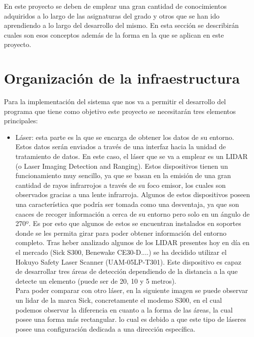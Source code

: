 \textit{}

En este proyecto se deben de emplear una gran cantidad de  conocimientos adquiridos a lo largo de las asignaturas del grado y otros que se han ido aprendiendo a lo largo del desarrollo del mismo. En esta sección se describirán cuales son esos conceptos además de la forma en la que se aplican en este proyecto.

\section{Organización de la infraestructura}

Para la implementación del sistema que nos va a permitir el desarrollo del programa que tiene como objetivo este proyecto se necesitarán tres elementos principales:
\begin{itemize}
	 \item Láser: esta parte es la que se encarga de obtener los datos de su entorno. Estos datos serán enviados a través de una interfaz hacia la unidad de tratamiento de datos.  En este caso, el láser que se va a emplear es un LIDAR (o Laser Imaging Detection and Ranging). Estos dispositivos tienen un funcionamiento muy sencillo, ya que se basan en la emisión de una gran cantidad de rayos infrarrojos a través de su foco emisor, los cuales son observados gracias a una lente infrarroja. Algunos de estos dispositivos poseen una característica que podría ser tomada como una desventaja, ya que son caaces de recoger información a cerca de su entorno pero solo en un ángulo de 270º. Es por esto que algunos de estos se encuentran instalados en soportes donde se les permita girar para poder obtener información del entorno completo. Tras heber analizado algunos de los LIDAR presentes hoy en día en el mercado (Sick S300, Benewake CE30-D....) se ha decidido utilizar el Hokuyo Safety Laser Scanner (UAM-05LP-T301). Este dispositivo es capaz de desarrollar tres áreas de detección dependiendo de la distancia a la que detecte un elemento (puede ser de 20, 10 y 5 metros).\\
	 Para poder comparar con otro láser, en la siguiente imagen se puede observar un lidar de la marca Sick, concretamente el modemo S300, en el cual podemos observar la diferencia en cuanto a la forma de las áreas, la cual posee una forma más rectangular. lo cual es debido a que este tipo de láseres posee una configuración dedicada a una dirección específica.

\end{itemize}
